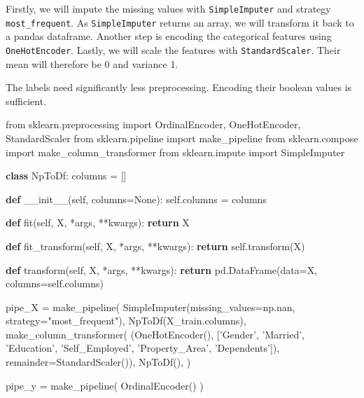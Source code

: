 \documentclass[]{article}
\newenvironment{Shaded}{}{}
\newcommand{\ControlFlowTok}[1]{\textcolor[rgb]{0.00,0.44,0.13}{\textbf{#1}}}
\newcommand{\FunctionTok}[1]{\textcolor[rgb]{0.02,0.16,0.49}{#1}}
\newcommand{\ImportTok}[1]{#1}
\newcommand{\KeywordTok}[1]{\textcolor[rgb]{0.00,0.44,0.13}{\textbf{#1}}}
\newcommand{\NormalTok}[1]{#1}
\newcommand{\OperatorTok}[1]{\textcolor[rgb]{0.40,0.40,0.40}{#1}}
\newcommand{\StringTok}[1]{\textcolor[rgb]{0.25,0.44,0.63}{#1}}
\newcommand{\VariableTok}[1]{\textcolor[rgb]{0.10,0.09,0.49}{#1}}
\begin{document}
Firstly, we will impute the missing values with \texttt{SimpleImputer}
and strategy \texttt{most\_frequent}. As \texttt{SimpleImputer} returns
an array, we will transform it back to a pandas dataframe. Another step
is encoding the categorical features using \texttt{OneHotEncoder}.
Lastly, we will scale the features with \texttt{StandardScaler}. Their
mean will therefore be 0 and variance 1.

The labels need significantly less preprocessing. Encoding their boolean
values is sufficient.

\begin{Shaded}
\begin{Highlighting}[]
\ImportTok{from}\NormalTok{ sklearn.preprocessing }\ImportTok{import}\NormalTok{ OrdinalEncoder, OneHotEncoder, StandardScaler}
\ImportTok{from}\NormalTok{ sklearn.pipeline }\ImportTok{import}\NormalTok{ make_pipeline}
\ImportTok{from}\NormalTok{ sklearn.compose }\ImportTok{import}\NormalTok{ make_column_transformer}
\ImportTok{from}\NormalTok{ sklearn.impute }\ImportTok{import}\NormalTok{ SimpleImputer}

\KeywordTok{class}\NormalTok{ NpToDf:}
\NormalTok{    columns }\OperatorTok{=}\NormalTok{ []}

    \KeywordTok{def} \FunctionTok{__init__}\NormalTok{(}\VariableTok{self}\NormalTok{, columns}\OperatorTok{=}\VariableTok{None}\NormalTok{):}
        \VariableTok{self}\NormalTok{.columns }\OperatorTok{=}\NormalTok{ columns}

    \KeywordTok{def}\NormalTok{ fit(}\VariableTok{self}\NormalTok{, X, }\OperatorTok{*}\NormalTok{args, }\OperatorTok{**}\NormalTok{kwargs):}
        \ControlFlowTok{return}\NormalTok{ X}

    \KeywordTok{def}\NormalTok{ fit_transform(}\VariableTok{self}\NormalTok{, X, }\OperatorTok{*}\NormalTok{args, }\OperatorTok{**}\NormalTok{kwargs):}
        \ControlFlowTok{return} \VariableTok{self}\NormalTok{.transform(X)}

    \KeywordTok{def}\NormalTok{ transform(}\VariableTok{self}\NormalTok{, X, }\OperatorTok{*}\NormalTok{args, }\OperatorTok{**}\NormalTok{kwargs):}
        \ControlFlowTok{return}\NormalTok{ pd.DataFrame(data}\OperatorTok{=}\NormalTok{X, columns}\OperatorTok{=}\VariableTok{self}\NormalTok{.columns)}

\NormalTok{pipe_X }\OperatorTok{=}\NormalTok{ make_pipeline(}
\NormalTok{    SimpleImputer(missing_values}\OperatorTok{=}\NormalTok{np.nan, strategy}\OperatorTok{=}\StringTok{"most_frequent"}\NormalTok{),}
\NormalTok{    NpToDf(X_train.columns),}
\NormalTok{    make_column_transformer(}
\NormalTok{        (OneHotEncoder(), [}\StringTok{'Gender'}\NormalTok{, }\StringTok{'Married'}\NormalTok{, }\StringTok{'Education'}\NormalTok{, }\StringTok{'Self_Employed'}\NormalTok{, }\StringTok{'Property_Area'}\NormalTok{, }\StringTok{'Dependents'}\NormalTok{]),}
\NormalTok{        remainder}\OperatorTok{=}\NormalTok{StandardScaler()),}
\NormalTok{    NpToDf(),}
\NormalTok{)}

\NormalTok{pipe_y }\OperatorTok{=}\NormalTok{ make_pipeline(}
\NormalTok{    OrdinalEncoder()}
\NormalTok{)}
\end{Highlighting}
\end{Shaded}
\end{document}

